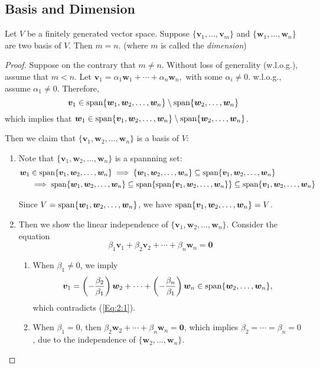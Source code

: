 \subsection{Basis and Dimension}
\begin{theorem}
Let $V$ be a finitely generated vector space. Suppose $\{\bm v_1,\dots,\bm v_m\}$ and $\{\bm w_1,\dots,\bm w_n\}$ are two basis of $V$. Then $m=n$. (where $m$ is called the \emph{dimension})
\end{theorem}
\begin{proof}
Suppose on the contrary that $m\ne n$. Without loss of generality (w.l.o.g.), assume that $m<n$. 
Let 
$
\bm v_1=\alpha_1\bm w_1+\cdots+\alpha_n\bm w_n,
$
with some $\alpha_i\ne0$. w.l.o.g., assume $\alpha_1\ne0$. Therefore, 
\begin{equation}\label{Eq:2:1}
\bm v_1\in\Span\{\bm w_1,\bm w_2,\dots,\bm w_n\}\setminus\Span\{\bm w_2,\dots,\bm w_n\}
\end{equation}
which implies that $\bm w_1\in\operatorname{span}\{\bm v_1,\bm w_2,\dots,\bm w_n\}\setminus\operatorname{span}\{\bm w_2,\dots,\bm w_n\}$.

Then we claim that $\{\bm v_1,\bm w_2,\dots,\bm w_n\}$ is a basis of $V$:
\begin{enumerate}
\item
Note that $\{\bm v_1,\bm w_2,\dots,\bm w_n\}$ is a spannning set:
\begin{align*}
\bm w_1&\in\operatorname{span}\{\bm v_1,\bm w_2,\dots,\bm w_n\}
\implies
\{\bm w_1,\bm w_2,\dots,\bm w_n\}\subseteq
\operatorname{span}\{\bm v_1,\bm w_2,\dots,\bm w_n\}\\
&\implies
\operatorname{span}\{\bm w_1,\bm w_2,\dots,\bm w_n\}\subseteq\operatorname{span}\{\operatorname{span}\{\bm v_1,\bm w_2,\dots,\bm w_n\}\}\subseteq\operatorname{span}\{\bm v_1,\bm w_2,\dots,\bm w_n\}
\end{align*}

Since $V=\operatorname{span}\{\bm w_1,\bm w_2,\dots,\bm w_n\}$, we have $\operatorname{span}\{\bm v_1,\bm w_2,\dots,\bm w_n\}=V$.

\item
Then we show the linear independence of $\{\bm v_1,\bm w_2,\dots,\bm w_n\}$.
Consider the equation 
\[
\beta_1\bm v_1+\beta_2\bm v_2+\cdots+\beta_n\bm w_n=\bm0
\]
\begin{enumerate}
\item
When $\beta_1\ne0$, we imply
\[
\bm v_1=
\left(
-\frac{\beta_2}{\beta_1}
\right)
\bm w_2
+\cdots+
\left(
-\frac{\beta_n}{\beta_1}
\right)
\bm w_n
\in\operatorname{span}\{\bm w_2,\dots,\bm w_n\},
\]
which contradicts (\ref{Eq:2:1}).
\item
When $\beta_1=0$, then $\beta_2\bm w_2+\cdots+\beta_n\bm w_n=\bm0$, which implies $\beta_2=\cdots=\beta_n=0$, due to the independence of $\{\bm w_2,\dots,\bm w_n\}$.
\end{enumerate}
\end{enumerate}


\end{proof}
